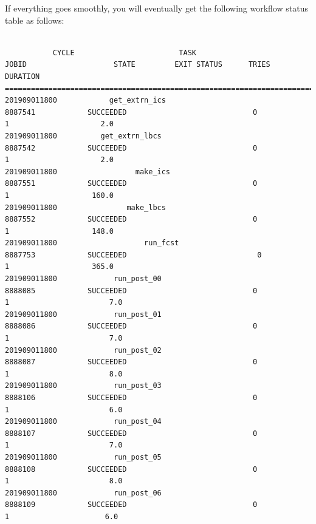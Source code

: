 \documentclass[11pt,fleqn]{report}              %
\begin{document}
If everything goes smoothly, you will eventually get the following workflow status table as follows:
\lstset{language=bash}   
\begin{lstlisting}[frame=trBL, basicstyle=\tiny]

           CYCLE                        TASK                                JOBID                    STATE         EXIT STATUS      TRIES         DURATION
====================================================================================================
201909011800            get_extrn_ics                            8887541            SUCCEEDED                             0                1                     2.0
201909011800          get_extrn_lbcs                            8887542            SUCCEEDED                             0                1                     2.0
201909011800                  make_ics                            8887551            SUCCEEDED                             0                1                   160.0
201909011800                make_lbcs                            8887552            SUCCEEDED                             0                1                   148.0
201909011800                    run_fcst                            8887753            SUCCEEDED                              0               1                   365.0
201909011800             run_post_00                            8888085            SUCCEEDED                             0                1                       7.0
201909011800             run_post_01                            8888086            SUCCEEDED                             0                1                       7.0
201909011800             run_post_02                            8888087            SUCCEEDED                             0                1                       8.0
201909011800             run_post_03                            8888106            SUCCEEDED                             0                1                       6.0
201909011800             run_post_04                            8888107            SUCCEEDED                             0                1                       7.0
201909011800             run_post_05                            8888108            SUCCEEDED                             0                1                       8.0
201909011800             run_post_06                            8888109            SUCCEEDED                             0                 1                      6.0

\end{lstlisting}
\end{document}
